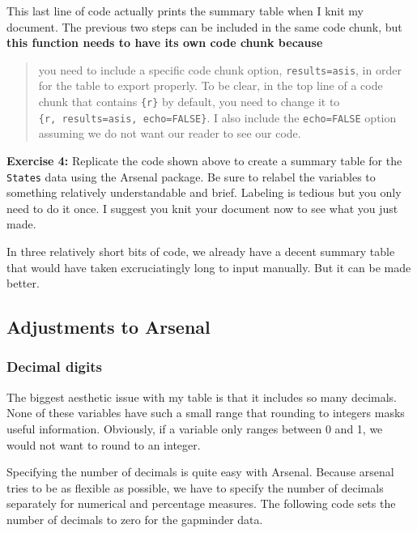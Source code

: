 \documentclass[
]{book}
\newenvironment{rmdblock}[1]
  {\begin{shaded*}
  }
  {\end{shaded*}
  }
\newenvironment{learncheck}
  {\begin{rmdblock}{warning}}
  {\end{rmdblock}}
\begin{document}
This last line of code actually prints the summary table when I knit my document. The previous two steps can be included in the same code chunk, but \textbf{this function needs to have its own code chunk because}

\begin{quote}
you need to include a specific code chunk option, \texttt{results=\textquotesingle{}asis\textquotesingle{}}, in order for the table to export properly. To be clear, in the top line of a code chunk that contains \texttt{\{r\}} by default, you need to change it to \texttt{\{r,\ results=\textquotesingle{}asis\textquotesingle{},\ echo=FALSE\}}. I also include the \texttt{echo=FALSE} option assuming we do not want our reader to see our code.
\end{quote}

\begin{learncheck}
\textbf{Exercise 4:} Replicate the code shown above to create a summary
table for the \texttt{States} data using the Arsenal package. Be sure to
relabel the variables to something relatively understandable and brief.
Labeling is tedious but you only need to do it once. I suggest you knit
your document now to see what you just made.
\end{learncheck}

In three relatively short bits of code, we already have a decent summary table that would have taken excruciatingly long to input manually. But it can be made better.

\hypertarget{adjustments-to-arsenal}{%
\subsection{Adjustments to Arsenal}\label{adjustments-to-arsenal}}

\hypertarget{decimal-digits}{%
\subsubsection{Decimal digits}\label{decimal-digits}}

The biggest aesthetic issue with my table is that it includes so many decimals. None of these variables have such a small range that rounding to integers masks useful information. Obviously, if a variable only ranges between 0 and 1, we would not want to round to an integer.

Specifying the number of decimals is quite easy with Arsenal. Because arsenal tries to be as flexible as possible, we have to specify the number of decimals separately for numerical and percentage measures. The following code sets the number of decimals to zero for the gapminder data.
\end{document}
